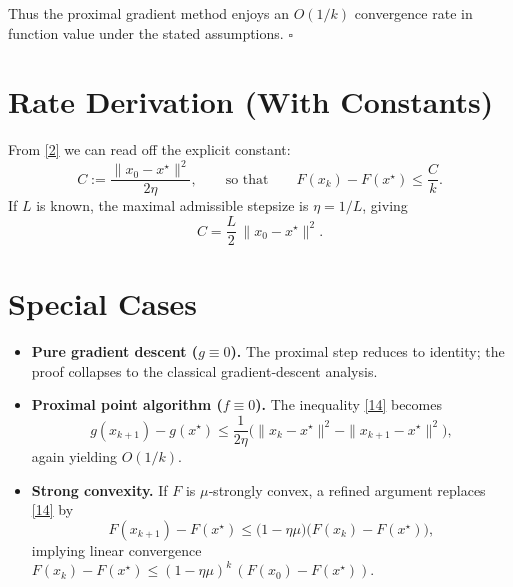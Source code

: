 \documentclass{article}
\begin{document}

Thus the proximal gradient method enjoys an $O(1/k)$ convergence rate in function value under the stated assumptions. $\square$

\section*{Rate Derivation (With Constants)}
From \eqref{2} we can read off the explicit constant:
\[
C:=\frac{\|x_{0}-x^{\star}\|^{2}}{2\eta},
\qquad\text{so that}\qquad
F(x_{k})-F(x^{\star})\le \frac{C}{k}.
\]
If $L$ is known, the maximal admissible stepsize is $\eta=1/L$, giving
\[
C=\frac{L}{2}\,\|x_{0}-x^{\star}\|^{2}.
\]

\section*{Special Cases}
\begin{itemize}
\item \textbf{Pure gradient descent ($g\equiv0$).} The proximal step reduces to identity; the proof collapses to the classical gradient‑descent analysis.
\item \textbf{Proximal point algorithm ($f\equiv0$).} The inequality \eqref{14} becomes
\[
g(x_{k+1})-g(x^{\star})\le\frac{1}{2\eta}\bigl(\|x_{k}-x^{\star}\|^{2}-\|x_{k+1}-x^{\star}\|^{2}\bigr),
\]
again yielding $O(1/k)$.
\item \textbf{Strong convexity.} If $F$ is $\mu$‑strongly convex, a refined argument replaces \eqref{14} by
\[
F(x_{k+1})-F(x^{\star})\le\bigl(1-\eta\mu\bigr)\bigl(F(x_{k})-F(x^{\star})\bigr),
\]
implying linear convergence $F(x_{k})-F(x^{\star})\le (1-\eta\mu)^{k}\, (F(x_{0})-F(x^{\star}))$.
\end{itemize}
\end{document}
